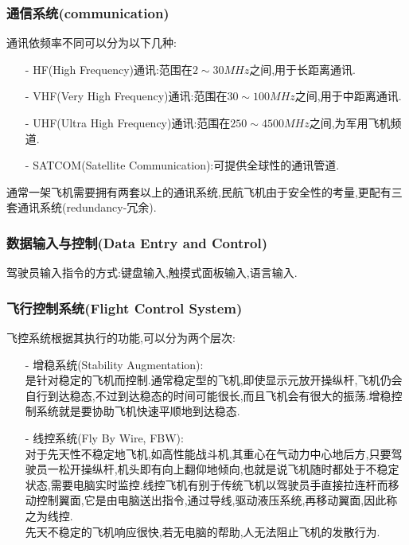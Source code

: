 \documentclass[9pt, oneside]{book}
\begin{document}
\subsubsection{通信系统(communication)}

通讯依频率不同可以分为以下几种:

\begin{itemize}
    \item [-] HF(High Frequency)通讯:范围在$2\sim 30MHz$之间,用于长距离通讯.
    \item [-] VHF(Very High Frequency)通讯:范围在$30\sim 100MHz$之间,用于中距离通讯.
    \item [-] UHF(Ultra High Frequency)通讯:范围在$250\sim 4500MHz$之间,为军用飞机频道.
    \item [-] SATCOM(Satellite Communication):可提供全球性的通讯管道.
\end{itemize}

通常一架飞机需要拥有两套以上的通讯系统,民航飞机由于安全性的考量,更配有三套通讯系统(redundancy-冗余).

\subsubsection{数据输入与控制(Data Entry and Control)}

驾驶员输入指令的方式:键盘输入,触摸式面板输入,语言输入.

\subsubsection{飞行控制系统(Flight Control System)}

飞控系统根据其执行的功能,可以分为两个层次:

\begin{itemize}
    \item [-] 增稳系统(Stability Augmentation): \\
        是针对稳定的飞机而控制.通常稳定型的飞机,即使显示元放开操纵杆,飞机仍会自行到达稳态,不过到达稳态的时间可能很长,而且飞机会有很大的振荡.增稳控制系统就是要协助飞机快速平顺地到达稳态.
    \item [-] 线控系统(Fly By Wire, FBW): \\
        对于先天性不稳定地飞机,如高性能战斗机,其重心在气动力中心地后方,只要驾驶员一松开操纵杆,机头即有向上翻仰地倾向,也就是说飞机随时都处于不稳定状态,需要电脑实时监控.线控飞机有别于传统飞机以驾驶员手直接拉连杆而移动控制翼面,它是由电脑送出指令,通过导线,驱动液压系统,再移动翼面,因此称之为线控. \\
        先天不稳定的飞机响应很快,若无电脑的帮助,人无法阻止飞机的发散行为.
\end{itemize}
\end{document}
